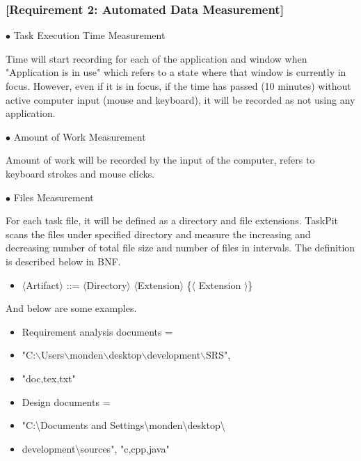 \documentclass [paper]{ieice}
\begin{document}
\subsubsection{[Requirement 2: Automated Data Measurement]}

\noindent $\bullet$ Task Execution Time Measurement \par
	Time will start recording for each of the application and window when "Application is in use" which refers to a state where that window is currently in focus. However, even if it is in focus, if the time has passed (10 minutes) without active computer input (mouse and keyboard), it will be recorded as not using any application. \newline

\noindent $\bullet$ Amount of Work Measurement \par
	Amount of work will be recorded by the input of the computer, refers to keyboard strokes and mouse clicks. \newline
	
\noindent $\bullet$ Files Measurement \par
	For each task file, it will be defined as a directory and file extensions. TaskPit scans the files under specified directory and measure the increasing  and decreasing number of total file size and number of files in intervals. The definition is described below in BNF.

\begin{itemize}
	\item[] $\langle$Artifact$\rangle$ ::= $\langle$Directory$\rangle$ $\langle$Extension$\rangle$ \{$\langle$ Extension $\rangle$\}
\end{itemize}

\noindent And below are some examples. \par
	
\begin{itemize}
	\item[] Requirement analysis documents = 
	\item[] "C:$\backslash$Users$\backslash$monden$\backslash$desktop$\backslash$development$\backslash$SRS", 
	\item[]"doc,tex,txt" \newline
	\item[]Design documents = 
	\item[] "C:\textbackslash Documents and Settings\textbackslash monden\textbackslash desktop\textbackslash 
	\item[] development\textbackslash sources", "c,cpp,java" \newline
\end{itemize}
\end{document}
